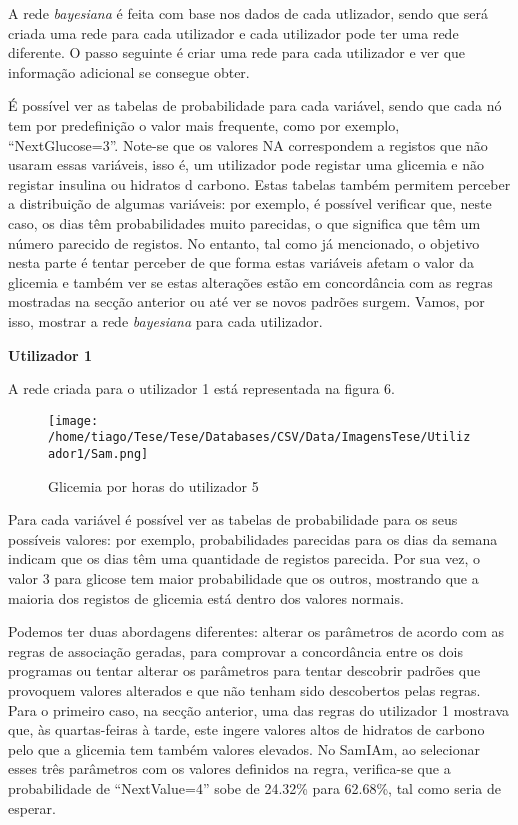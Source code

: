 A rede \textit{bayesiana} é feita com base nos dados de cada utlizador, sendo que será criada uma rede para cada utilizador e cada utilizador pode ter uma rede diferente. O passo seguinte é criar uma rede para cada utilizador e ver que informação adicional se consegue obter.

É possível ver as tabelas de probabilidade para cada variável, sendo que cada nó tem por predefinição o valor mais frequente, como por exemplo, ``Next\textunderscore Glucose=3''. Note-se que os valores NA correspondem a registos que não usaram essas variáveis, isso é, um utilizador pode registar uma glicemia e não registar insulina ou hidratos d carbono. Estas tabelas também permitem perceber a distribuição de algumas variáveis: por exemplo, é possível verificar que, neste caso, os dias têm probabilidades muito parecidas, o que significa que têm um número parecido de registos. No entanto, tal como já mencionado, o objetivo nesta parte é tentar perceber de que forma estas variáveis afetam o valor da glicemia e também ver se estas alterações estão em concordância com as regras mostradas na secção anterior ou até ver se novos padrões surgem. Vamos, por isso, mostrar a rede \textit{bayesiana} para cada utilizador. 

\textbf{Utilizador 1}

A rede criada para o utilizador 1 está representada na figura 6.

\begin{figure}[H]
\centering
\texttt{[image: /home/tiago/Tese/Tese/Databases/CSV/Data/ImagensTese/Utilizador1/Sam.png]}
\caption{Glicemia por horas do utilizador 5}
\end{figure}
Para cada variável é possível ver as tabelas de probabilidade para os seus possíveis valores: por exemplo, probabilidades parecidas para os dias da semana indicam que os dias têm uma quantidade de registos parecida. Por sua vez, o valor 3 para glicose tem maior probabilidade que os outros, mostrando que a maioria dos registos de glicemia está dentro dos valores normais.

Podemos ter duas abordagens diferentes: alterar os parâmetros de acordo com as regras de associação geradas, para comprovar a concordância entre os dois programas ou tentar alterar os parâmetros para tentar descobrir padrões que provoquem valores alterados e que não tenham sido descobertos pelas regras. 
Para o primeiro caso, na secção anterior, uma das regras do utilizador 1 mostrava que, às quartas-feiras à tarde, este ingere valores altos de hidratos de carbono pelo que a glicemia tem também valores elevados. No SamIAm, ao selecionar esses três parâmetros com os valores definidos na regra, verifica-se que a probabilidade de ``Next\textunderscore Value=4'' sobe de 24.32\% para 62.68\%, tal como seria de esperar.

